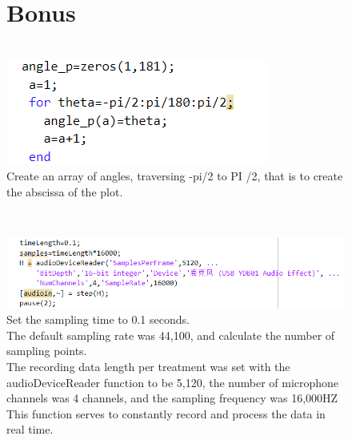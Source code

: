 \documentclass{report}
\begin{document}
\begin{figure}
\section{Bonus}
~\\
\includegraphics[scale=1]{创建角度数组}
\\Create an array of angles, traversing -pi/2 to PI /2, that is to create the abscissa of the plot.
\end{figure}
~\\
\begin{figure}
\includegraphics[scale=1]{设置初始值}
\\Set the sampling time to 0.1 seconds.
\\The default sampling rate was 44,100, and calculate the number of sampling points.
\\The recording data length per treatment was set with the audioDeviceReader function to be 5,120, the number of microphone channels was 4 channels, and the sampling frequency was 16,000HZ
This function serves to constantly record and process the data in real time.
\end{figure}
~\\
\end{document}
